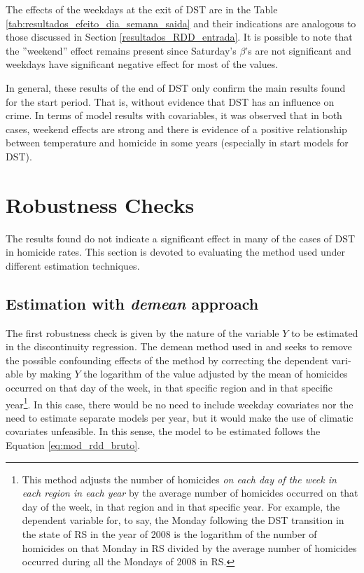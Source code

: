 \documentclass[12pt,openright,oneside,a4paper,english,french,spanish]{abntex2}
\numberwithin{table}{section} %
\numberwithin{figure}{section} %
\newcommand{\co}{\citeonline}
\begin{document}
\begin{otherlanguage}{english}
The effects of the weekdays at the exit of DST are in the Table \ref{tab:resultados_efeito_dia_semana_saida} and their indications are analogous to those discussed in Section \ref{resultados_RDD_entrada}. It is possible to note that the ''weekend'' effect remains present since Saturday's $\beta$'s are not significant and weekdays have significant negative effect for most of the values.

In general, these results of the end of DST only confirm the main results found for the start period. That is, without evidence that DST has an influence on crime. In terms of model results with covariables, it was observed that in both cases, weekend effects are strong and there is evidence of a positive relationship between temperature and homicide in some years (especially in start models for DST).


\section{Robustness Checks\label{resultados_robustez}}

The results found do not indicate a significant effect in many of the cases of DST in homicide rates. This section is devoted to evaluating the method used under different estimation techniques. 

\subsection{Estimation with \textit{demean} approach\label{robustez_demean}}

The first robustness check is given by the nature of the variable $Y$ to be estimated in the discontinuity regression. The demean method used in \co{smith2016} and \co{toro2016} seeks to remove the possible confounding effects of the method by correcting the dependent variable by making $Y$ the logarithm of the value adjusted by the mean of homicides occurred on that day of the week, in that specific region and in that specific year\footnote{This method adjusts the number of homicides \textit{on each day of the week in each region in each year} by the average number of homicides occurred on that day of the week, in that region and in that specific year. For example, the dependent variable for, to say, the Monday following the DST transition in the state of RS in the year of 2008 is the logarithm of the number of homicides on that Monday in RS divided by the average number of homicides occurred during all the Mondays of 2008 in RS.}. In this case, there would be no need to include weekday covariates nor the need to estimate separate models per year, but it would make the use of climatic covariates unfeasible. In this sense, the model to be estimated follows the Equation \ref{eq:mod_rdd_bruto}.


\end{otherlanguage}
\end{document}
